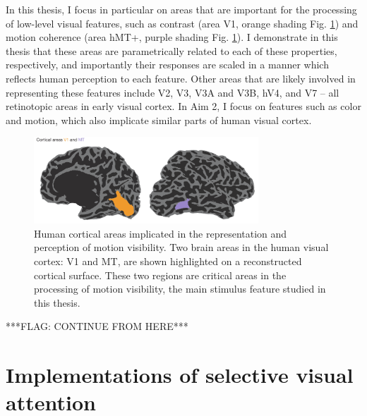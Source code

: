 In this thesis, I focus in particular on areas that are important for the processing of low-level visual features, such as contrast (area V1, orange shading Fig. \ref{fig:c0f2}) and motion coherence (area hMT+, purple shading Fig. \ref{fig:c0f2}). I demonstrate in this thesis that these areas are parametrically related to each of these properties, respectively, and importantly their responses are scaled in a manner which reflects human perception to each feature. Other areas that are likely involved in representing these features include V2, V3, V3A and V3B, hV4, and V7 -- all retinotopic areas in early visual cortex. In Aim 2, I focus on features such as color and motion, which also implicate similar parts of human visual cortex.

\begin{figure}[ht]
\centering
\includegraphics[keepaspectratio,width=0.75\textwidth]{figs_c0/brains.pdf}
\caption[Brain regions implicated in motion visibility perception]{Human cortical areas implicated in the representation and perception of motion visibility. Two brain areas in the human visual cortex: V1 and MT, are shown highlighted on a reconstructed cortical surface. These two regions are critical areas in the processing of motion visibility, the main stimulus feature studied in this thesis.}
\label{fig:c0f2}
\end{figure}

***FLAG: CONTINUE FROM HERE***

\section{Implementations of selective visual attention}

